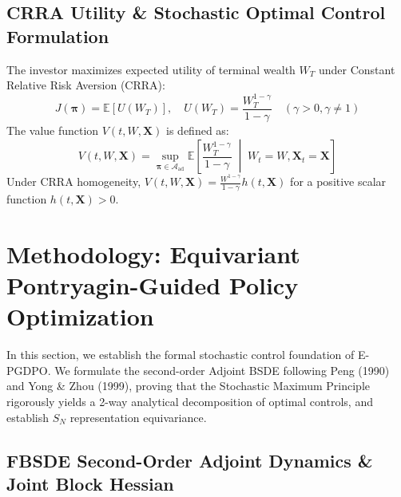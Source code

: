 \documentclass[11pt,a4paper]{article}
\theoremstyle{plain}
\theoremstyle{definition}
\theoremstyle{remark}
\begin{document}
\subsection{CRRA Utility \& Stochastic Optimal Control Formulation}
The investor maximizes expected utility of terminal wealth $W_T$ under Constant Relative Risk Aversion (CRRA):
\begin{equation}
    J(\mathbf{\pi}) = \mathbb{E} \left[ U(W_T) \right], \quad U(W_T) = \frac{W_T^{1-\gamma}}{1-\gamma} \quad (\gamma > 0, \gamma \neq 1)
\end{equation}
The value function $V(t, W, \mathbf{X})$ is defined as:
\begin{equation}
    V(t, W, \mathbf{X}) = \sup_{\mathbf{\pi} \in \mathcal{A}_{\text{ad}}} \mathbb{E} \left[ \frac{W_T^{1-\gamma}}{1-\gamma} \;\middle|\; W_t = W, \mathbf{X}_t = \mathbf{X} \right]
\end{equation}
Under CRRA homogeneity, $V(t, W, \mathbf{X}) = \frac{W^{1-\gamma}}{1-\gamma} h(t, \mathbf{X})$ for a positive scalar function $h(t, \mathbf{X}) > 0$.

\section{Methodology: Equivariant Pontryagin-Guided Policy Optimization}

In this section, we establish the formal stochastic control foundation of E-PGDPO. We formulate the second-order Adjoint BSDE following Peng (1990) and Yong \& Zhou (1999), proving that the Stochastic Maximum Principle rigorously yields a 2-way analytical decomposition of optimal controls, and establish $S_N$ representation equivariance.

\subsection{FBSDE Second-Order Adjoint Dynamics \& Joint Block Hessian}
\end{document}
